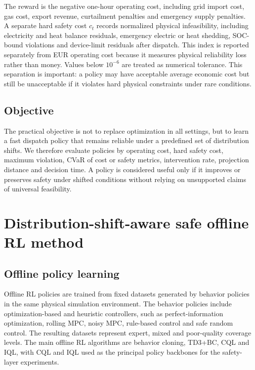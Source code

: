 \documentclass[preprint,12pt]{elsarticle}
\begin{document}
The reward is the negative one-hour operating cost, including grid import cost, gas cost, export revenue, curtailment penalties and emergency supply penalties. A separate hard safety cost $c_t$ records normalized physical infeasibility, including electricity and heat balance residuals, emergency electric or heat shedding, SOC-bound violations and device-limit residuals after dispatch. This index is reported separately from EUR operating cost because it measures physical reliability loss rather than money. Values below $10^{-6}$ are treated as numerical tolerance. This separation is important: a policy may have acceptable average economic cost but still be unacceptable if it violates hard physical constraints under rare conditions.

\subsection{Objective}

The practical objective is not to replace optimization in all settings, but to learn a fast dispatch policy that remains reliable under a predefined set of distribution shifts. We therefore evaluate policies by operating cost, hard safety cost, maximum violation, CVaR of cost or safety metrics, intervention rate, projection distance and decision time. A policy is considered useful only if it improves or preserves safety under shifted conditions without relying on unsupported claims of universal feasibility.



\section{Distribution-shift-aware safe offline RL method}

\subsection{Offline policy learning}

Offline RL policies are trained from fixed datasets generated by behavior policies in the same physical simulation environment. The behavior policies include optimization-based and heuristic controllers, such as perfect-information optimization, rolling MPC, noisy MPC, rule-based control and safe random control. The resulting datasets represent expert, mixed and poor-quality coverage levels. The main offline RL algorithms are behavior cloning, TD3+BC, CQL and IQL, with CQL and IQL used as the principal policy backbones for the safety-layer experiments.
\end{document}
